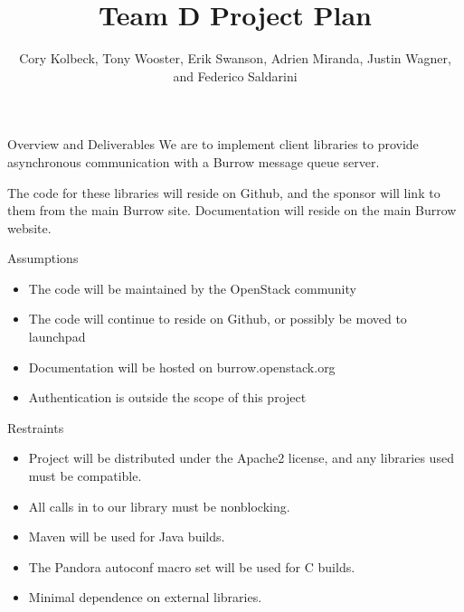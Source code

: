 \documentclass{beamer}
\begin{document}
\title{Team D Project Plan}
\author[C. Kolbeck, T. Wooster, E. Swanson, A. Miranda, J. Wagner, and F. Saldarini]{Cory Kolbeck, Tony Wooster, Erik Swanson, Adrien Miranda, Justin Wagner, and Federico Saldarini}

\begin{frame}
  \titlepage
\end{frame}

\begin{frame}{Overview and Deliverables}
  We are to implement client libraries to provide asynchronous communication with a Burrow message queue server.

  The code for these libraries will reside on Github, and the sponsor will link to them from the main Burrow site. 
  Documentation will reside on the main Burrow website. 
\end{frame}

\begin{frame}{Assumptions}

  \begin{itemize}
  \item The code will be maintained by the OpenStack community
  \item The code will continue to reside on Github, or possibly be moved to launchpad
  \item Documentation will be hosted on burrow.openstack.org
  \item Authentication is outside the scope of this project
  \end{itemize}

\end{frame}

\begin{frame}{Restraints}

  \begin{itemize}
  \item Project will be distributed under the Apache2 license, and any libraries used must be compatible.
  \item All calls in to our library must be nonblocking.
  \item Maven will be used for Java builds.
  \item The Pandora autoconf macro set will be used for C builds.
  \item Minimal dependence on external libraries.
  \end{itemize}

\end{frame}
\end{document}

